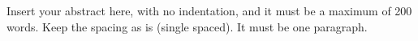 Insert your abstract here, with no indentation, and it must be a maximum of 200 words.
Keep the spacing as is (single spaced).
It must be one paragraph.
